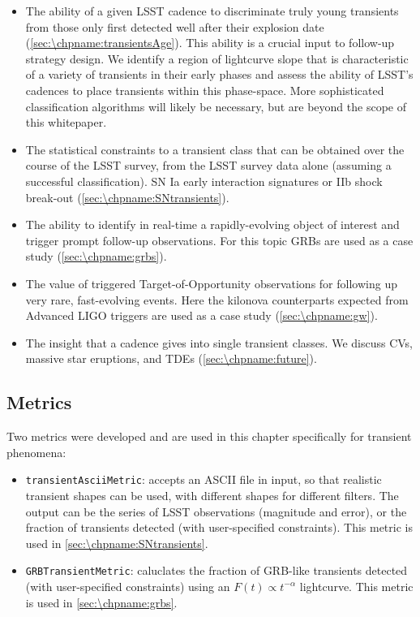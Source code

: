 \begin{itemize}
\item
  The ability of a given LSST cadence to discriminate truly young
  transients from those only first detected well after their explosion date (\autoref{sec:\chpname:transientsAge}).
  This ability is a crucial input to follow-up strategy design.
  We identify a region of lightcurve slope
  that is characteristic of a
  variety of transients in their early phases and assess the ability of LSST's
  cadences to place transients within this phase-space.
  More sophisticated classification algorithms will likely be necessary, but
  are beyond the scope of this whitepaper.
\item
  The statistical constraints to a transient class that can be obtained
  over the course of the LSST survey, from the LSST survey data alone
  (assuming a successful classification). SN Ia early interaction
  signatures or IIb shock break-out (\autoref{sec:\chpname:SNtransients}).
\item
  The ability to identify in real-time a rapidly-evolving
  object of interest and
  trigger prompt follow-up observations. For this topic GRBs are used as
  a case study (\autoref{sec:\chpname:grbs}).
\item
  The value of triggered Target-of-Opportunity observations for
  following up very rare, fast-evolving events.   Here the kilonova
  counterparts expected from Advanced LIGO triggers are used as a
  case study (\autoref{sec:\chpname:gw}).
\item
  The insight that a cadence gives into single transient classes. We
  discuss CVs, massive star eruptions, and TDEs (\autoref{sec:\chpname:future}).

\end{itemize}



\subsection{Metrics}
\label{sec:\chpname:metrics}

Two metrics were developed and are used in this chapter specifically for transient phenomena:
\begin{itemize}
  \item{\texttt{transientAsciiMetric}: accepts an ASCII file in input, so that realistic transient shapes can be used, with different shapes for different filters. The output can be the series of LSST observations (magnitude and error), or the fraction of transients detected (with user-specified constraints). This metric is used in \autoref{sec:\chpname:SNtransients}.}
  \item{\texttt{GRBTransientMetric}: caluclates the fraction of GRB-like transients detected (with user-specified constraints) using an $F(t) \propto t^{-\alpha}$
    lightcurve. This metric is used in \autoref{sec:\chpname:grbs}}.
\end{itemize}

